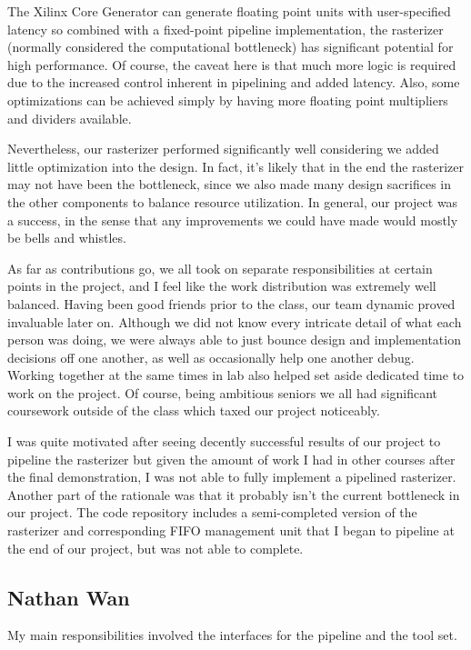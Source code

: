 \documentclass[letterpaper,10pt]{article}
\begin{document}
The Xilinx Core Generator can generate floating point units with user-specified latency so combined with a fixed-point pipeline implementation, the rasterizer (normally considered the computational bottleneck) has significant potential for high performance. Of course, the caveat here is that much more logic is required due to the increased control inherent in pipelining and added latency. Also, some optimizations can be achieved simply by having more floating point multipliers and dividers available.

Nevertheless, our rasterizer performed significantly well considering we added little optimization into the design. In fact, it's likely that in the end the rasterizer may not have been the bottleneck, since we also made many design sacrifices in the other components to balance resource utilization. In general, our project was a success, in the sense that any improvements we could have made would mostly be bells and whistles. 

As far as contributions go, we all took on separate responsibilities at certain points in the project, and I feel like the work distribution was extremely well balanced. Having been good friends prior to the class, our team dynamic proved invaluable later on. Although we did not know every intricate detail of what each person was doing, we were always able to just bounce design and implementation decisions off one another, as well as occasionally help one another debug. Working together at the same times in lab also helped set aside dedicated time to work on the project. Of course, being ambitious seniors we all had significant coursework outside of the class which taxed our project noticeably.

I was quite motivated after seeing decently successful results of our project to pipeline the rasterizer but given the amount of work I had in other courses after the final demonstration, I was not able to fully implement a pipelined rasterizer. Another part of the rationale was that it probably isn't the current bottleneck in our project. The code repository includes a semi-completed version of the rasterizer and corresponding FIFO management unit that I began to pipeline at the end of our project, but was not able to complete.
\subsection{Nathan Wan}

My main responsibilities involved the interfaces for the pipeline and the tool set.
\end{document}
